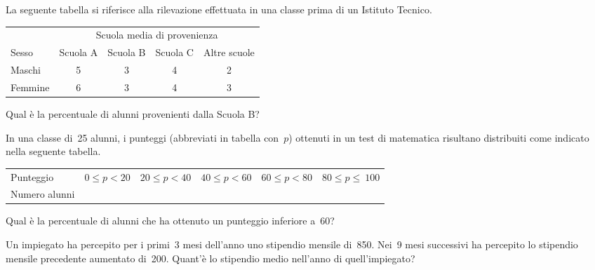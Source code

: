 \begin{esercizio}
\label{ese:A.52}
La seguente tabella si riferisce alla rilevazione effettuata in una classe 
prima di un Istituto Tecnico.
\begin{center}
 \begin{tabular}{l*{4}{c}}
\toprule
 & \multicolumn{4}{c}{Scuola media di provenienza}\\
Sesso & Scuola A & Scuola B & Scuola C & Altre scuole\\
\midrule
Maschi & 5 & 3 & 4 & 2 \\
Femmine & 6 & 3 & 4 & 3 \\
\bottomrule
\end{tabular}
\end{center}
Qual è la percentuale di alunni provenienti dalla Scuola B?
\end{esercizio}

\begin{esercizio}
\label{ese:A.53}
In una classe di~25 alunni, i punteggi (abbreviati in tabella con~$p$) 
ottenuti in un test di matematica risultano distribuiti come indicato nella 
seguente tabella.
\begin{center}
 \begin{tabular}{l*{5}{c}}
\toprule
Punteggio & $0 \leq p < 20$ & $20 \leq p < 40$ & $40 \leq p < 60$ & $60 
\leq p < 80$ & $80 \leq p \leq~100$ \\
Numero alunni & & & & & \\
\bottomrule
\end{tabular}
\end{center}
Qual è la percentuale di alunni che ha ottenuto un punteggio inferiore a~60?
\end{esercizio}

\begin{esercizio}
\label{ese:A.54}
Un impiegato ha percepito per i primi~3 mesi dell'anno uno stipendio 
mensile di~850\officialeuro . Nei~9 mesi successivi ha percepito
lo stipendio mensile precedente aumentato di~200\officialeuro . Quant'è lo 
stipendio medio nell'anno di quell'impiegato?
\end{esercizio}

